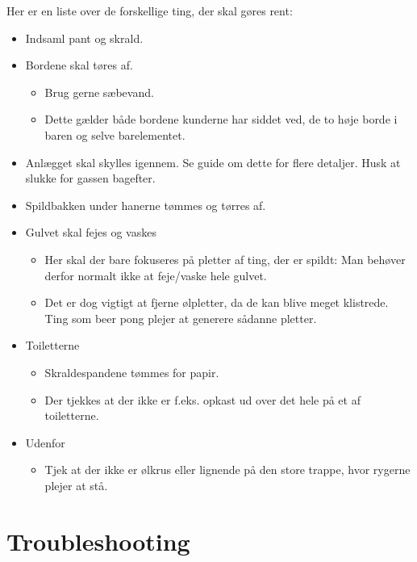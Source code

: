 Her er en liste over de forskellige ting, der skal gøres rent:
\begin{itemize}
\item Indsaml pant og skrald.
\item Bordene skal tøres af.
  \begin{itemize}
  \item Brug gerne sæbevand.
  \item Dette gælder både bordene kunderne har siddet ved, de to høje
    borde i baren og selve barelementet.
  \end{itemize}
\item Anlægget skal skylles igennem. Se guide om dette for flere
  detaljer. Husk at slukke for gassen bagefter.
\item Spildbakken under hanerne tømmes og tørres af.
\item Gulvet skal fejes og vaskes
  \begin{itemize}
  \item Her skal der bare fokuseres på pletter af ting, der er spildt:
    Man behøver derfor normalt ikke at feje/vaske hele gulvet.
  \item Det er dog vigtigt at fjerne ølpletter, da de kan blive meget
    klistrede. Ting som beer pong plejer at generere sådanne pletter.
  \end{itemize}
\item Toiletterne
  \begin{itemize}
  \item Skraldespandene tømmes for papir.
  \item Der tjekkes at der ikke er f.eks. opkast ud over det hele på
    et af toiletterne.
  \end{itemize}
\item Udenfor
  \begin{itemize}
  \item Tjek at der ikke er ølkrus eller lignende på den store trappe,
    hvor rygerne plejer at stå.
  \end{itemize}
\end{itemize}

\section{Troubleshooting}
\label{sec:troubleshooting}


